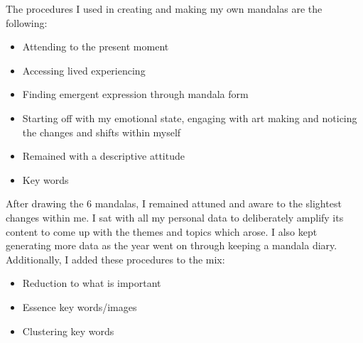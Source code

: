

The procedures I used in creating and making my own mandalas are the following:
\begin{itemize}
\item Attending to the present moment
\end{itemize}

\begin{itemize}
\item Accessing lived experiencing 
\end{itemize}

\begin{itemize}
\item Finding emergent expression through mandala form
\end{itemize}

\begin{itemize}
\item Starting off with my emotional state, engaging with art making and noticing the changes and shifts within myself
\end{itemize}

\begin{itemize}
\item Remained with a descriptive attitude 
\end{itemize}

\begin{itemize}
\item Key words
\end{itemize}


After drawing the 6 mandalas, I remained attuned and aware to the slightest changes within me. I sat with all my personal data to deliberately amplify its content to come up with the themes and topics which arose. I also kept generating more data as the year went on through keeping a mandala diary. 
Additionally, I added these procedures to the mix: 

\begin{itemize}
\item Reduction to what is important 
\end{itemize}

\begin{itemize}
\item Essence key words/images
\end{itemize}

\begin{itemize}
\item Clustering key words
\end{itemize}

